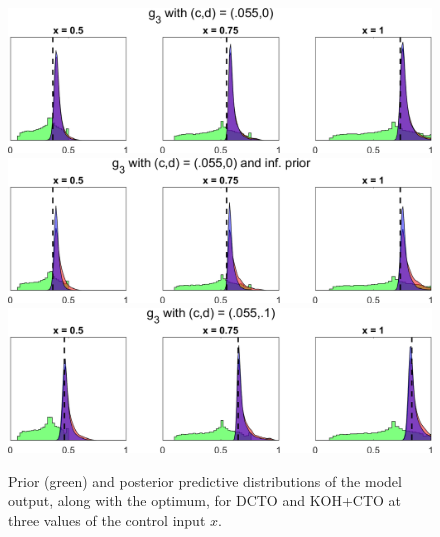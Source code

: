 \documentclass[12pt]{article}
\begin{document}
\begin{figure}
	\centering
	\includegraphics[scale=0.85]{FIG_DCTO_KOHCTO_post_pred_dist_discrep5}\\
	\vspace{1em}
	\includegraphics[scale=0.85]{FIG_DCTO_KOHCTO_post_pred_dist_discrep5_inf}\\
	\vspace{1em}
	\includegraphics[scale=0.85]{FIG_DCTO_KOHCTO_post_pred_dist_discrep6}
	\captionsetup{width=.85\linewidth}
	\caption{Prior (green) and posterior predictive distributions of the model output, along with the optimum, for DCTO and KOH+CTO at three values of the control input $x$.}
	\label{fig:3_post_dist}
\end{figure}
%


\bigskip

%
%
%
%




\end{document}
